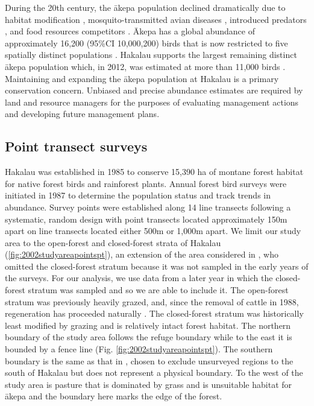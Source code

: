 \documentclass{statsoc}
\newcommand{\akepa}{\textquotesingle\={a}kepa}  %
\newcommand{\Akepa}{\textquotesingle\={A}kepa}  %
\begin{document}
During the 20th century, the \akepa{} population declined dramatically due to habitat modification \citep{scott_HFBS_1986, pratt_avifaunal_1994},  mosquito-transmitted avian diseases \citep{pratt_avifaunal_1994, atkinson_wildlife_1995}, introduced predators \citep{lepson_akepa_1997}, and food resources competitors \citep{lepson_akepa_1997}. \Akepa{} has a global abundance of approximately 16,200 (95\%CI 10,000,200) birds that is now restricted to five spatially distinct populations \citep{judge_akepa_2018}. Hakalau supports the largest remaining distinct \akepa{} population which, in 2012, was estimated at more than 11,000 birds \citep{camp_statespace_2016}. Maintaining and expanding the \akepa{} population at Hakalau is a primary conservation concern. Unbiased and precise abundance estimates are required by land and resource managers for the purposes of evaluating management actions and developing future management plans.

\subsection{Point transect surveys}

Hakalau was established in 1985 to conserve 15,390 ha of montane forest habitat for native forest birds and rainforest plants. Annual forest bird surveys were initiated in 1987 to determine the population status and track trends in abundance. Survey points were established along 14 line transects following a systematic, random design with point transects located approximately 150m apart on line transects located either 500m or 1,000m apart. We limit our study area to the open-forest and closed-forest strata of Hakalau (\autoref{fig:2002studyareapointspt}), an extension of the area considered in \cite{camp_population_2010, camp_statespace_2016}, who omitted the closed-forest stratum because it was not sampled in the early years of the surveys.  For our analysis, we use data from a later year in which the closed-forest stratum was sampled and so we are able to include it.  The open-forest stratum was previously heavily grazed, and, since the removal of cattle in 1988, regeneration has proceeded naturally \citep{maxfield_hakalau_1998}. The closed-forest stratum was historically least modified by grazing and is relatively intact forest habitat.  The northern boundary of the study area follows the refuge boundary while to the east it is bounded by a fence line (Fig. \ref{fig:2002studyareapointspt}). The southern boundary is the same as that in \cite{camp_population_2010}, chosen to exclude unsurveyed regions to the south of Hakalau but does not represent a physical boundary. To the west of the study area is pasture that is dominated by grass and is unsuitable habitat for \akepa{} and the boundary here marks the edge of the forest.
\end{document}
